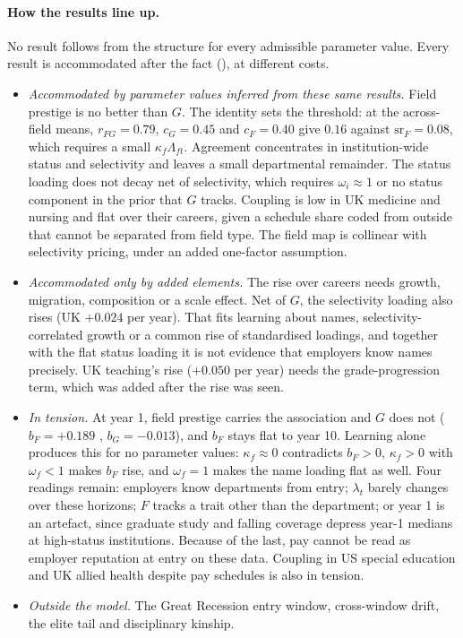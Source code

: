 \paragraph{How the results line up.} No result follows from the structure for every admissible parameter value.
Every result is accommodated after the fact (\SItheory), at different costs.
\begin{itemize}
\item \emph{Accommodated by parameter values inferred from these same results.} Field prestige is no better
than $G$. The identity sets the threshold: at the across-field means, $r_{FG}=0.79$, $c_G=0.45$ and $c_F=0.40$
give $0.16$ against $\mathrm{sr}_F=0.08$, which requires a small $\kappa_f\Lambda_{ft}$. Agreement concentrates
in institution-wide status and selectivity and leaves a small departmental remainder. The status loading does not
decay net of selectivity, which requires $\omega_i\approx1$ or no status component in the prior that $G$ tracks.
Coupling is low in UK medicine and nursing and flat over their careers, given a schedule share coded from outside
that cannot be separated from field type. The field map is collinear with selectivity pricing, under an added
one-factor assumption.
\item \emph{Accommodated only by added elements.} The rise over careers needs growth, migration, composition or a
scale effect. Net of $G$, the selectivity loading also rises (UK $+0.024$ per year). That fits learning about
names, selectivity-correlated growth or a common rise of standardised loadings, and together with the flat status
loading it is not evidence that employers know names precisely. UK teaching's rise ($+0.050$ per year) needs the
grade-progression term, which was added after the rise was seen.
\item \emph{In tension.} At year 1, field prestige carries the association and $G$ does not ($b_F=+0.189$
, $b_G=-0.013$), and $b_F$ stays flat to year 10. Learning alone produces this for no
parameter values: $\kappa_f\approx0$ contradicts $b_F>0$, $\kappa_f>0$ with $\omega_f<1$ makes $b_F$ rise, and
$\omega_f=1$ makes the name loading flat as well. Four readings remain: employers know departments from entry;
$\lambda_t$ barely changes over these horizons; $F$ tracks a trait other than the department; or year 1 is an
artefact, since graduate study and falling coverage depress year-1 medians at high-status institutions. Because of
the last, pay cannot be read as employer reputation at entry on these data. Coupling in US special education and
UK allied health despite pay schedules is also in tension.
\item \emph{Outside the model.} The Great Recession entry window, cross-window drift, the elite tail and
disciplinary kinship.
\end{itemize}

